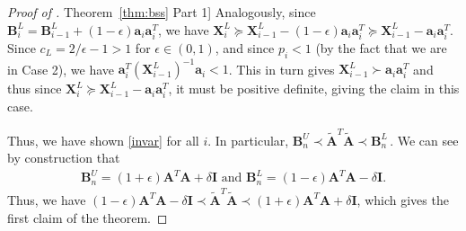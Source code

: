 \documentclass[11pt]{article}
\numberwithin{equation}{section}
\theoremstyle{definition}
\theoremstyle{plain}
\newcommand{\expref}[2]{\hyperref[#2]{#1~\ref{#2}}}
\newcommand{\bv}[1]{\mathbf{#1}}
\begin{document}
\begin{proof}[Proof of \expref{Theorem}{thm:bss} Part 1]
Analogously, since $\bv{B}_i^L = \bv{B}_{i-1}^L + (1-\epsilon) \bv{a}_i \bv{a}_i^T$, we have $\bv{X}_{i}^L \succeq \bv{X}_{i-1}^L - (1-\epsilon) \bv{a}_i \bv{a}_i^T \succeq  \bv{X}_{i-1}^L-\bv{a}_i \bv{a}_i^T$. Since $c_L = 2/\epsilon - 1 > 1$ for $\epsilon \in (0,1)$, and since $p_i < 1$ (by the fact that we are in Case 2), we have $\bv{a}_i^T (\bv{X}^L_{i-1})^{-1} \bv{a}_i < 1$. This in turn gives $\bv{X}^L_{i-1} \succ \bv{a}_i \bv{a}_i^T $ and thus  since  $\bv{X}_{i}^L \succeq \bv{X}_{i-1}^L-\bv{a}_i \bv{a}_i^T$, it must be positive definite, giving the claim in this case.

Thus, we have shown \eqref{invar} for all $i$. In particular, $\bv{B}^U_n \prec  \bv{\tilde A}^T \bv{\tilde A} \prec \bv{B}^L_n$\,. We can see by  construction that
\begin{align*}
\bv{B}^U_n = (1+\epsilon) \bv{A}^T \bv{A} + \delta \bv{I}\text{ and }
\bv{B}^L_n = (1-\epsilon) \bv{A}^T \bv{A} - \delta \bv{I}.
\end{align*}
Thus, we have $(1-\epsilon) \bv{A}^T \bv{A} - \delta \bv{I} \prec \bv{\tilde A}^T \bv{\tilde A}  \prec (1+\epsilon) \bv{A}^T \bv{A} + \delta \bv{I}$, which gives the first claim of the theorem.
\end{proof}
\end{document}
